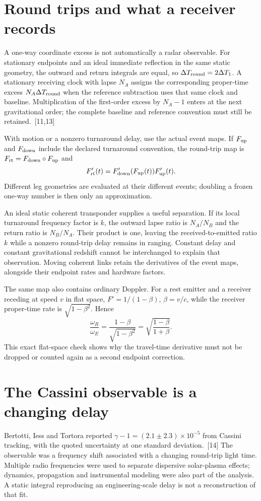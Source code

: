 \documentclass[10pt,twocolumn,letterpaper]{article}
\begin{document}
\section{Round trips and what a receiver records}
A one-way coordinate excess is not automatically a radar observable. For stationary endpoints and an ideal immediate reflection in the same static geometry, the outward and return integrals are equal, so $\Delta T_{\rm round}=2\Delta T_1$. A stationary receiving clock with lapse $N_A$ assigns the corresponding proper-time excess $N_A\Delta T_{\rm round}$ when the reference subtraction uses that same clock and baseline. Multiplication of the first-order excess by $N_A-1$ enters at the next gravitational order; the complete baseline and reference convention must still be retained.~[11,13]

With motion or a nonzero turnaround delay, use the actual event maps. If $F_{\rm up}$ and $F_{\rm down}$ include the declared turnaround convention, the round-trip map is $F_{\rm rt}=F_{\rm down}\circ F_{\rm up}$ and
\[
 F'_{\rm rt}(t)=F'_{\rm down}(F_{\rm up}(t))F'_{\rm up}(t).
\]
Different leg geometries are evaluated at their different events; doubling a frozen one-way number is then only an approximation.

An ideal static coherent transponder supplies a useful separation. If its local turnaround frequency factor is $k$, the outward lapse ratio is $N_A/N_B$ and the return ratio is $N_B/N_A$. Their product is one, leaving the received-to-emitted ratio $k$ while a nonzero round-trip delay remains in ranging. Constant delay and constant gravitational redshift cannot be interchanged to explain that observation. Moving coherent links retain the derivatives of the event maps, alongside their endpoint rates and hardware factors.

The same map also contains ordinary Doppler. For a rest emitter and a receiver receding at speed $v$ in flat space, $F'=1/(1-\beta)$, $\beta=v/c$, while the receiver proper-time rate is $\sqrt{1-\beta^2}$. Hence
\[
 \frac{\omega_R}{\omega_E}
 =\frac{1-\beta}{\sqrt{1-\beta^2}}
 =\sqrt{\frac{1-\beta}{1+\beta}}.
\]
This exact flat-space check shows why the travel-time derivative must not be dropped or counted again as a second endpoint correction.


\section{The Cassini observable is a changing delay}
Bertotti, Iess and Tortora reported $\gamma-1=(2.1\pm 2.3)\times 10^{-5}$ from Cassini tracking, with the quoted uncertainty at one standard deviation.~[14] The observable was a frequency shift associated with a changing round-trip light time. Multiple radio frequencies were used to separate dispersive solar-plasma effects; dynamics, propagation and instrumental modeling were also part of the analysis. A static integral reproducing an engineering-scale delay is not a reconstruction of that fit.
\end{document}
